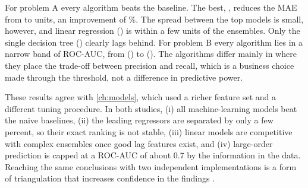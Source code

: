 


For problem A every algorithm beats the baseline. The best, \AlgRegBest, reduces the MAE from \AlgRegBaseMAE to
\AlgRegBestMAE units, an improvement of \AlgRegGain\%. The spread between the top models is small, however, and
linear regression (\AlgLinMAE) is within a few units of the ensembles. Only the single decision tree
(\AlgDTMAE) clearly lags behind. For problem B every algorithm lies in a narrow band of ROC-AUC, from
\AlgClsWorstAUC (\AlgClsWorst) to \AlgClsBestAUC (\AlgClsBest). The algorithms differ mainly in where they place
the trade-off between precision and recall, which is a business choice made through the threshold, not a
difference in predictive power.

These results agree with \cref{ch:models}, which used a richer feature set and a different tuning procedure. In
both studies, (i) all machine-learning models beat the naive baselines, (ii) the leading regressors are
separated by only a few percent, so their exact ranking is not stable, (iii) linear models are competitive with
complex ensembles once good lag features exist, and (iv) large-order prediction is capped at a ROC-AUC of about
0.7 by the information in the data. Reaching the same conclusions with two independent implementations is a
form of triangulation that increases confidence in the findings \citep{shadish2002, kuhn2019}.

